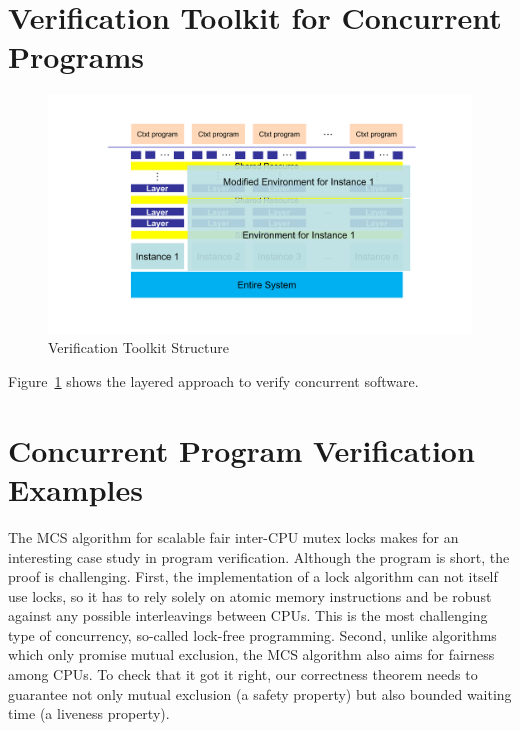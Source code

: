 \section{Verification Toolkit for Concurrent Programs}
\label{chapter:introduction:sec:verification-toolkit-for-concurrent-programs}

\begin{figure}
\includegraphics[width=\textwidth]{figs/intro}
\caption{Verification Toolkit Structure}
\label{chapter:intro:verification-toolkit-structure} 
\end{figure}

Figure~\ref{chapter:intro:verification-toolkit-structure}  shows
the layered approach to verify concurrent  software.



\section{Concurrent Program Verification Examples}
\label{chapter:introduction:sec:concurrent-program-verification-examples}


The MCS algorithm for scalable fair inter-CPU mutex locks makes for an interesting case study in program verification.
Although the program is short, the proof is challenging.
First, the implementation of a lock algorithm can not itself use locks, so it has to rely solely on atomic memory instructions and be robust against any possible interleavings between CPUs. This is the most challenging type of concurrency, so-called lock-free programming.
Second, unlike algorithms which only promise mutual exclusion, the MCS algorithm also aims for fairness among CPUs. To check that it got it right, our correctness theorem needs to guarantee not only mutual exclusion (a safety property) but also bounded waiting time (a liveness property).

